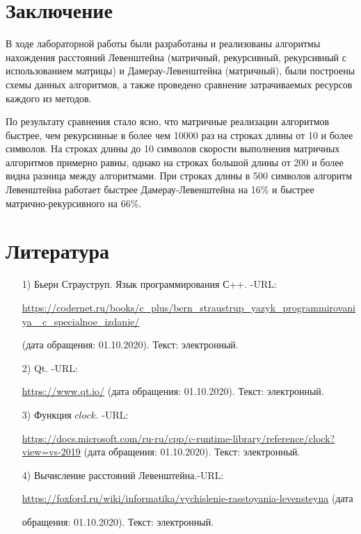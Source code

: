 \documentclass[12pt]{report}
\begin{document}
\chapter*{Заключение}
В ходе лабораторной работы были разработаны и реализованы алгоритмы нахождения расстояний
Левенштейна (матричный, рекурсивный, рекурсивный с использованием матрицы) и Дамерау-Левенштейна (матричный), были построены схемы данных алгоритмов, а также проведено сравнение затрачиваемых ресурсов каждого из методов. \par 
По результату сравнения стало ясно, что матричные реализации алгоритмов быстрее, чем рекурсивные в более чем 10000 раз на строках длины от 10 и более символов. На строках длины до 10 символов скорости выполнения матричных алгоритмов примерно равны, однако на строках большой длины от 200 и более видна разница между алгоритмами.  При строках длины в 500 символов алгоритм Левенштейна работает быстрее Дамерау-Левенштейна на 16\% и быстрее матрично-рекурсивного на 66\%. 

\chapter*{Литература}

\begin{enumerate}
	\label{CPlusPlus}
	\item[1)] Бьерн Страуструп. Язык программирования С++. -URL:\par 
	\href{https://codernet.ru/books/c_plus/bern_straustrup_yazyk_programmirovaniya_c_specialnoe_izdanie/}
	{https://codernet.ru/books/c\_plus/bern\_straustrup\_yazyk\_programmirovaniya\_
		c\_specialnoe\_izdanie/}\par(дата обращения:
	01.10.2020). Текст: электронный.
	
	\label{Cute}
	\item[2)] Qt. -URL:\par
	\href{https://www.qt.io/}{https://www.qt.io/} (дата обращения: 01.10.2020). Текст: электронный.
	
	\label{CLOCK}
	\item[3)] Функция $clock$. -URL:\par
	\href{https://docs.microsoft.com/ru-ru/cpp/c-runtime-library/reference/clock?view=vs-2019}{https://docs.microsoft.com/ru-ru/cpp/c-runtime-library/reference/clock?view=vs-2019} (дата обращения:
	01.10.2020). Текст: электронный.
	
	\item[4)] Вычисление расстояний Левенштейна.-URL:\par
	\href{https://foxford.ru/wiki/informatika/vychislenie-rasstoyania-levensteyna}{https://foxford.ru/wiki/informatika/vychislenie-rasstoyania-levensteyna} (дата \par обращения:
	01.10.2020). Текст: электронный.
\end{enumerate}
\end{document}
